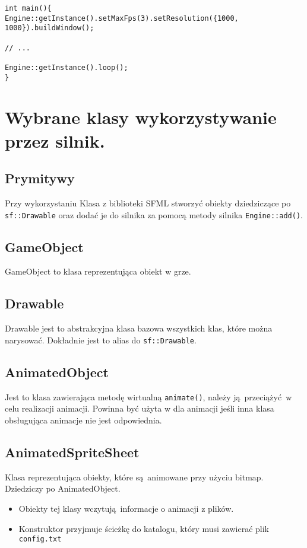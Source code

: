 \documentclass[11pt]{article}
\begin{document}
\begin{verbatim}
int main(){
Engine::getInstance().setMaxFps(3).setResolution({1000, 1000}).buildWindow();

// ...

Engine::getInstance().loop();
}
\end{verbatim}
\section{Wybrane klasy wykorzystywanie przez silnik.}
\label{sec:orgf4261ec}
\subsection{Prymitywy}
\label{sec:orgdaf9e9b}
Przy wykorzystaniu Klasa z biblioteki SFML stworzyć obiekty dziedziczące po \texttt{sf::Drawable} oraz dodać je do silnika za pomocą metody silnika \texttt{Engine::add()}.
\subsection{GameObject}
\label{sec:org9f15a33}
GameObject to klasa reprezentująca obiekt w grze.
\subsection{Drawable}
\label{sec:org55a1256}
Drawable jest to abstrakcyjna klasa bazowa wszystkich klas, które można narysować.
Dokładnie jest to alias do \texttt{sf::Drawable}.
\subsection{AnimatedObject}
\label{sec:org4e2a8d6}
Jest to klasa zawierająca metodę wirtualną \texttt{animate()}, należy ją przeciążyć w celu realizacji animacji.
Powinna być użyta w dla animacji jeśli inna klasa obsługująca animacje nie jest odpowiednia.
\subsection{AnimatedSpriteSheet}
\label{sec:orgf8b27f3}
Klasa reprezentująca obiekty, które są animowane przy użyciu bitmap. Dziedziczy po AnimatedObject.

\begin{itemize}
\item Obiekty tej klasy wczytują informacje o animacji z plików.

\item Konstruktor przyjmuje ścieżkę do katalogu, który musi zawierać plik \texttt{config.txt}
\end{itemize}
\end{document}
